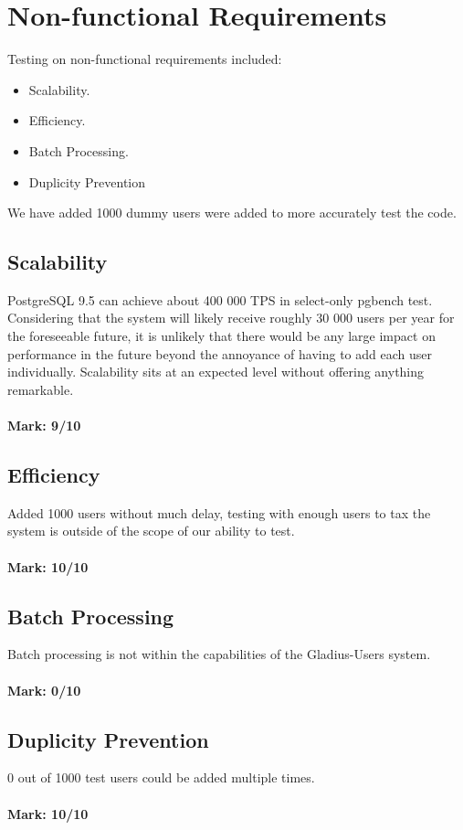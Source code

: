\documentclass[12pt]{article}
\begin{document}
\pagebreak
\section{Non-functional Requirements}
	Testing on non-functional requirements included:\\
	
	\begin{itemize}
		\item Scalability.
		\item Efficiency.
		\item Batch Processing.
		\item Duplicity Prevention
	\end{itemize}
	
	We have added 1000 dummy users were added to more accurately test the code.
	
\subsection{Scalability}
	PostgreSQL 9.5 can achieve about 400 000 TPS in select-only pgbench test. Considering that the system will likely receive roughly 30 000 users per year for the foreseeable 		future, it is unlikely that there would be any large impact on performance in the future beyond the annoyance of having to add each user individually. Scalability sits at an expected level 		without offering anything remarkable. \\ \\
	\textbf{Mark: 9/10}
	
\subsection{Efficiency} 
	Added 1000 users without much delay, testing with enough users to tax the system is outside of the scope of our ability to test. \\ \\ 
	\textbf{Mark: 10/10} 
	
\subsection{Batch Processing}
	Batch processing is not within the capabilities of the Gladius-Users system.\\ \\ 
	\textbf{Mark: 0/10}
	
\subsection{Duplicity Prevention}
	0 out of 1000 test users could be added multiple times. \\ \\ 
	\textbf{Mark: 10/10}
\end{document}
